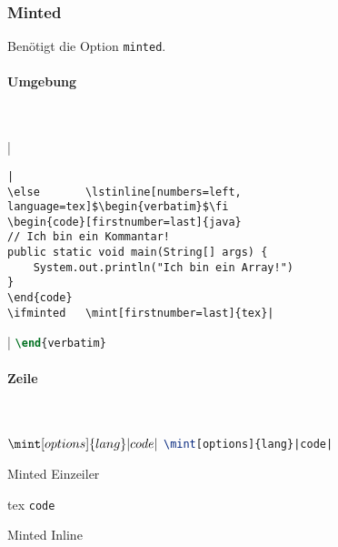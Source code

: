 \newpage
\subsubsection{Minted}
Benötigt die Option \texttt{minted}.
\paragraph{Umgebung}~\\
\begin{listing}
\ifminted   {}|\begin{verbatim}|
\else       \lstinline[numbers=left, language=tex]$\begin{verbatim}$\fi
\begin{code}[firstnumber=last]{java}
// Ich bin ein Kommantar!
public static void main(String[] args) {
    System.out.println("Ich bin ein Array!")
}
\end{code}
\ifminted   \mint[firstnumber=last]{tex}|\end{verbatim}|
\else       \lstinline[firstnumber=last, numbers=left, language=tex]$\end{verbatim}$\fi
\caption{Minted Umgebung}
\label{lst:minted-env}
\end{listing}

\paragraph{Zeile}~\\
\begin{listing}
\ifminted   {}$\mint[options]{lang}|code|$
\else       \lstinline[language=tex]$\mint[options]{lang}|code|$\fi
\caption{Minted Einzeiler}
\label{lst:minted-line}
\end{listing}

\begin{listing}
\begin{code}{tex}
\texttt{code}
\end{code}
\caption{Minted Inline}
\label{lst:minted-inline}
\end{listing}